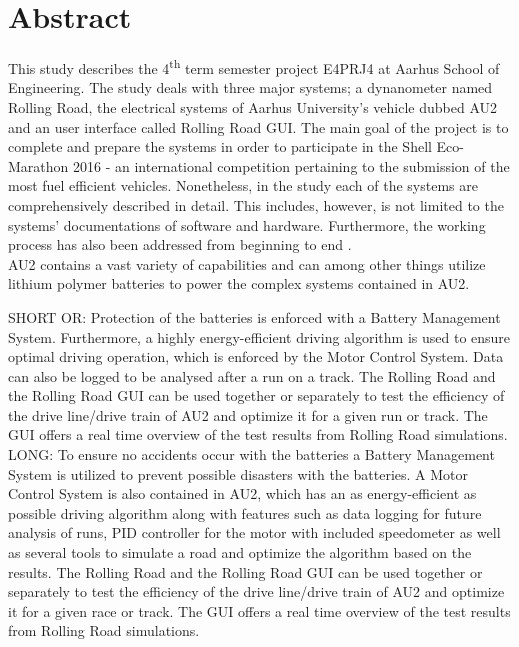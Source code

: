 \chapter{Abstract}
This study describes the 4\textsuperscript{th} term semester project E4PRJ4 at Aarhus School of Engineering. The study deals with three major systems; a dynanometer named Rolling Road, the electrical systems of Aarhus University's vehicle dubbed AU2 and an user interface called Rolling Road GUI. The main goal of the project is to complete and prepare the systems in order to participate in the Shell Eco-Marathon 2016 - an international competition pertaining to the submission of the most fuel efficient vehicles. Nonetheless, in the study  each of the systems are comprehensively described in detail. This includes, however, is not limited to the systems' documentations of  software and hardware. Furthermore, the working process has also been addressed from beginning to end . \\
AU2 contains a vast variety of capabilities and can among other things utilize lithium polymer batteries to power the complex systems contained in AU2.

SHORT OR:
Protection of the batteries is enforced with a Battery Management System. Furthermore, a highly energy-efficient driving algorithm is used to ensure optimal driving operation, which is enforced by the Motor Control System. Data can also be logged to be analysed after a run on a track.
The Rolling Road and the Rolling Road GUI can be used together or separately to test the efficiency of the drive line/drive train of AU2 and optimize it for a given run or track. The GUI offers a real time overview of the test results from Rolling Road simulations.\\

LONG:
To ensure no accidents occur with the batteries a Battery Management System is utilized to prevent possible disasters with the batteries. A Motor Control System is also contained in AU2, which has an as energy-efficient as possible driving algorithm along with features such as data logging for future analysis of runs, PID controller for the motor with included speedometer as well as several tools to simulate a road and optimize the algorithm based on the results. The Rolling Road and the Rolling Road GUI can be used together or separately to test the efficiency of the drive line/drive train of AU2 and optimize it for a given race or track. The GUI offers a real time overview of the test results from Rolling Road simulations.\\

